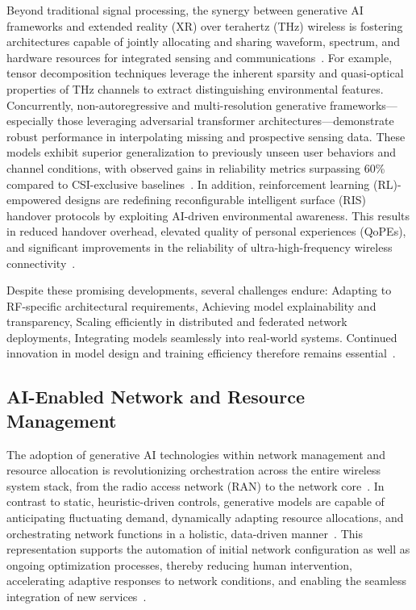 \documentclass[sigconf]{acmart}
\begin{document}
Beyond traditional signal processing, the synergy between generative AI frameworks and extended reality (XR) over terahertz (THz) wireless is fostering architectures capable of jointly allocating and sharing waveform, spectrum, and hardware resources for integrated sensing and communications~\cite{ref36}. For example, tensor decomposition techniques leverage the inherent sparsity and quasi-optical properties of THz channels to extract distinguishing environmental features. Concurrently, non-autoregressive and multi-resolution generative frameworks—especially those leveraging adversarial transformer architectures—demonstrate robust performance in interpolating missing and prospective sensing data. These models exhibit superior generalization to previously unseen user behaviors and channel conditions, with observed gains in reliability metrics surpassing 60\% compared to CSI-exclusive baselines~\cite{ref36}. In addition, reinforcement learning (RL)-empowered designs are redefining reconfigurable intelligent surface (RIS) handover protocols by exploiting AI-driven environmental awareness. This results in reduced handover overhead, elevated quality of personal experiences (QoPEs), and significant improvements in the reliability of ultra-high-frequency wireless connectivity~\cite{ref36}.

Despite these promising developments, several challenges endure:
Adapting to RF-specific architectural requirements,
Achieving model explainability and transparency,
Scaling efficiently in distributed and federated network deployments,
Integrating models seamlessly into real-world systems.
Continued innovation in model design and training efficiency therefore remains essential~\cite{ref15,ref36}.

\subsection{AI-Enabled Network and Resource Management}

The adoption of generative AI technologies within network management and resource allocation is revolutionizing orchestration across the entire wireless system stack, from the radio access network (RAN) to the network core~\cite{ref44}. In contrast to static, heuristic-driven controls, generative models are capable of anticipating fluctuating demand, dynamically adapting resource allocations, and orchestrating network functions in a holistic, data-driven manner~\cite{ref44,ref46}. This representation supports the automation of initial network configuration as well as ongoing optimization processes, thereby reducing human intervention, accelerating adaptive responses to network conditions, and enabling the seamless integration of new services~\cite{ref46}.
\end{document}
